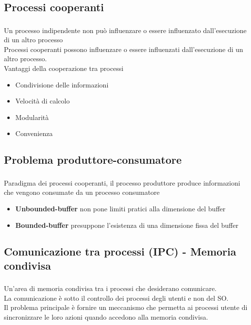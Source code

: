 \documentclass{beamer}
\newenvironment{mainframe}{
	\begin{frame}
		\frametitle{\insertsubsection}
		\framesubtitle{\insertsection}
	}{
	\end{frame}
}
\begin{document}
\subsection{Processi cooperanti}
\begin{mainframe}
	Un processo indipendente non può influenzare o essere influenzato dall'esecuzione di un altro processo\\
	Processi cooperanti possono influenzare o essere influenzati dall'esecuzione di un altro processo.\\
	Vantaggi della cooperazione tra processi
	\begin{itemize}
		\item Condivisione delle informazioni
		\item Velocità di calcolo
		\item Modularità
		\item Convenienza
	\end{itemize}
\end{mainframe}
\subsection{Problema produttore-consumatore}
\begin{mainframe}
	Paradigma dei processi cooperanti, il processo produttore produce informazioni che vengono consumate da un processo consumatore
	\begin{itemize}
		\item \textbf{Unbounded-buffer} non pone limiti pratici alla dimensione del buffer
		\item \textbf{Bounded-buffer} presuppone l'esistenza di una dimensione fissa del buffer
	\end{itemize}
\end{mainframe}
\subsection{Comunicazione tra processi (IPC) - Memoria condivisa}
\begin{mainframe}
	Un'area di memoria condivisa tra i processi che desiderano comunicare.\\
	La comunicazione è sotto il controllo dei processi degli utenti e non del SO.\\
	Il problema principale è fornire un meccanismo che permetta ai processi utente di sincronizzare le loro azioni quando accedono alla memoria condivisa.
\end{mainframe}
\end{document}

